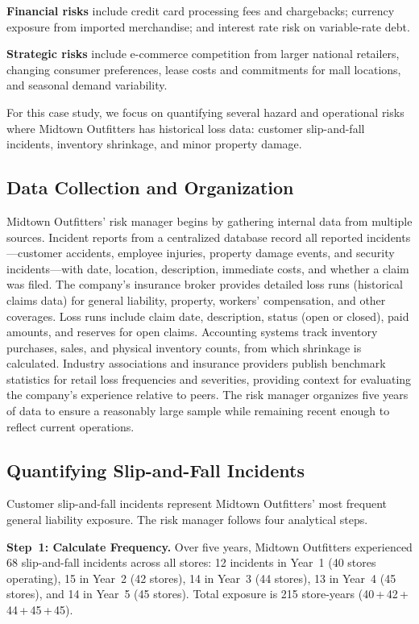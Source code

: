 \documentclass[11pt,openany]{book}
\begin{document}
\textbf{Financial risks} include credit card processing fees and chargebacks;
currency exposure from imported merchandise; and interest rate risk on
variable-rate debt.

\textbf{Strategic risks} include e-commerce competition from larger national
retailers, changing consumer preferences, lease costs and commitments for mall
locations, and seasonal demand variability.

For this case study, we focus on quantifying several hazard and operational
risks where Midtown Outfitters has historical loss data: customer slip-and-fall
incidents, inventory shrinkage, and minor property damage.

\subsection{Data Collection and Organization}
\label{subsec:midtown-data}

Midtown Outfitters' risk manager begins by gathering internal data from multiple
sources. Incident reports from a centralized database record all reported
incidents---customer accidents, employee injuries, property damage events, and
security incidents---with date, location, description, immediate costs, and
whether a claim was filed. The company's insurance broker provides detailed
loss runs (historical claims data) for general liability, property, workers'
compensation, and other coverages. Loss runs include claim date, description,
status (open or closed), paid amounts, and reserves for open claims. Accounting
systems track inventory purchases, sales, and physical inventory counts, from
which shrinkage is calculated. Industry associations and insurance providers
publish benchmark statistics for retail loss frequencies and severities,
providing context for evaluating the company's experience relative to peers.
The risk manager organizes five years of data to ensure a reasonably large
sample while remaining recent enough to reflect current operations.

\subsection{Quantifying Slip-and-Fall Incidents}
\label{subsec:midtown-slipfall}

Customer slip-and-fall incidents represent Midtown Outfitters' most frequent
general liability exposure. The risk manager follows four analytical steps.

\textbf{Step~1: Calculate Frequency.} Over five years, Midtown Outfitters
experienced 68 slip-and-fall incidents across all stores: 12 incidents in
Year~1 (40 stores operating), 15 in Year~2 (42 stores), 14 in Year~3
(44 stores), 13 in Year~4 (45 stores), and 14 in Year~5 (45 stores). Total
exposure is 215 store-years (40\,+\,42\,+\,44\,+\,45\,+\,45).
\end{document}
